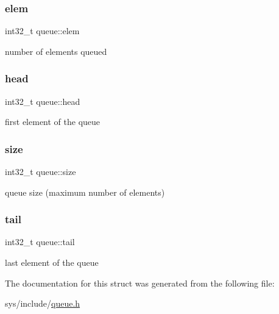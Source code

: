 \subsubsection{\texorpdfstring{elem}{elem}}
{\footnotesize\ttfamily int32\+\_\+t queue\+::elem}

number of elements queued \mbox{\label{structqueue_aec96f7889213946d685f28a0d6504428}} 
\subsubsection{\texorpdfstring{head}{head}}
{\footnotesize\ttfamily int32\+\_\+t queue\+::head}

first element of the queue \mbox{\label{structqueue_af80cfabc36286195365b6d666d518504}} 
\subsubsection{\texorpdfstring{size}{size}}
{\footnotesize\ttfamily int32\+\_\+t queue\+::size}

queue size (maximum number of elements) \mbox{\label{structqueue_ada0fe9a078df1d07623c761f2e8376ad}} 
\subsubsection{\texorpdfstring{tail}{tail}}
{\footnotesize\ttfamily int32\+\_\+t queue\+::tail}

last element of the queue 

The documentation for this struct was generated from the following file\+:\begin{DoxyCompactItemize}
\item 
sys/include/\hyperlink{queue_8h}{queue.\+h}\end{DoxyCompactItemize}
